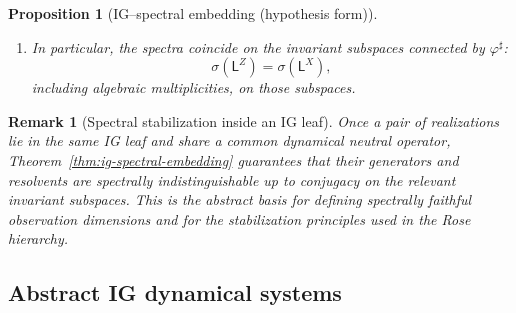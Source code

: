 \documentclass[11pt]{article}
\newtheorem{proposition}{Proposition}
\newtheorem{remark}{Remark}
\newcommand{\Lsf}{\mathsf{L}}
\begin{document}
\begin{proposition}[IG--spectral embedding (hypothesis form)]
\begin{enumerate}[label=(\alph*),leftmargin=1.8em]
  \item In particular, the spectra coincide on the invariant
  subspaces connected by $\varphi^\sharp$:
  \[
    \sigma(\Lsf^Z) = \sigma(\Lsf^X),
  \]
  including algebraic multiplicities, on those subspaces.
\end{enumerate}
\end{proposition}


\begin{remark}[Spectral stabilization inside an IG leaf]
Once a pair of realizations lie in the same IG leaf and share a common
dynamical neutral operator, Theorem~\ref{thm:ig-spectral-embedding}
guarantees that their generators and resolvents are spectrally
indistinguishable up to conjugacy on the relevant invariant subspaces.
This is the abstract basis for defining spectrally faithful observation
dimensions and for the stabilization principles used in the Rose
hierarchy.
\end{remark}


\subsection{Abstract IG dynamical systems}
\end{document}
